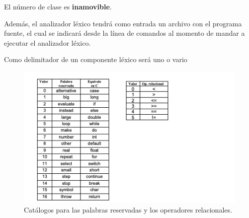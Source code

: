 \documentclass[12pt, a4paper]{article}
\begin{document}
El número de clase es \textbf{inamovible}. 

Además, el analizador léxico tendrá como entrada un archivo con el programa fuente, el cual se indicará desde la línea de comandos al momento de mandar a ejecutar el analizador léxico.

Como delimitador de un componente léxico será uno o vario


\begin{figure}[htpb!]
\centering
  \includegraphics[width=\textwidth]{catalogos.png}
\caption{Catálogos para las palabras reservadas y los operadores relacionales.}
\end{figure}\par


\end{document}
